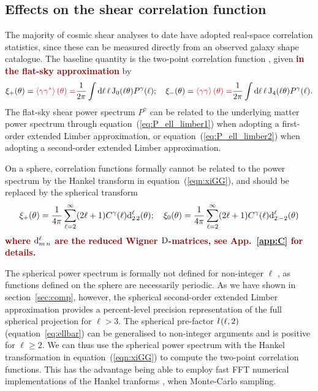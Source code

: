 \documentclass[fleqn,usenatbib]{mnras} %
\newcommand{\ellbar}{\hbox{\it \l}\,}
\newcommand{\forref}[1]{{\bf\textcolor{darkred}{#1}}}
\begin{document}
\subsection{Effects on the shear correlation function}
\label{sec:comp_xi}

The majority of cosmic shear analyses to date have adopted real-space
correlation statistics, since these can be measured directly from an observed
galaxy shape catalogue. The baseline quantity is the two-point correlation
function \citep{1991ApJ...370....1M, 1992ApJ...388..272K, BS01}, given \forref{in the flat-sky approximation} by
%
\begin{align}
  \xi_+(\theta) 
  = \forref{\left\langle \gamma \gamma^\ast \right\rangle(\theta) =} \frac 1 {2\pi} \int {\rm d} \ell \, \ell \, {\rm J}_0(\ell
   \theta)
  P^\gamma(\ell);
  \quad
   \xi_-(\theta)
  = \forref{\left\langle \gamma \gamma \right\rangle(\theta) =} \frac 1 {2\pi} \int
   {\rm d} \ell \, \ell \, {\rm J}_4(\ell \theta)
  P^\gamma(\ell).
   \label{eqn:xiGG}
\end{align}
%
The flat-sky shear power spectrum $P^\gamma$ can be related to the underlying
matter power spectrum through equation~(\ref{eq:P_ell_limber1}) when adopting a
first-order extended Limber approximation, or equation~(\ref{eq:P_ell_limber2})
when adopting a second-order extended Limber approximation.

On a sphere, correlation functions formally cannot be related to the power
spectrum by the Hankel transform in equation~(\ref{eqn:xiGG}), and should be
replaced by the spherical transform
\forref{\citep{1999IJMPD...8...61N,2004MNRAS.350..914C}}
%
\forref{
\begin{equation}
 \xi_+(\theta) 
  =  \frac 1{4\pi} \sum\limits_{\ell=2}^\infty (2 \ell + 1) C^\gamma(\ell) {\rm d}^\ell_{2\,2}(\theta); \quad 
 \xi_0(\theta) 
  =  \frac 1{4\pi} \sum\limits_{\ell=2}^\infty (2 \ell + 1) C^\gamma(\ell) {\rm d}^\ell_{2\,-2}(\theta)
  \label{eq:xi_wigner}
\end{equation}
}
%
\forref{where ${\rm d}^\ell_{m\,n}$ are the reduced Wigner ${\rm D}$-matrices, see App.~\ref{app:C} for details.}

The spherical power spectrum is formally not defined for non-integer $\ell$
\citep[see][for alternative spherical-sky formulae for the two-point
correlation function]{2005PhRvD..72b3516C}, as functions defined on the
sphere are necessarily periodic.
As we have shown in section~\ref{sec:comp}, however, the spherical second-order
extended Limber approximation provides a percent-level precision representation
of the full spherical projection for $\ell > 3$.
The spherical pre-factor $\ellbar(\ell, 2)$ (equation~\ref{eq:ellbar}) can be
generalised to non-integer arguments and is positive for $\ell \ge 2$. We can
thus use the spherical power spectrum with
the Hankel transformation in equation~(\ref{eqn:xiGG}) to compute the two-point correlation
functions. This has the advantage being able to employ fast FFT numerical implementations of
the Hankel tranforms \citep{2000MNRAS.312..257H}, when Monte-Carlo sampling.
\end{document}
